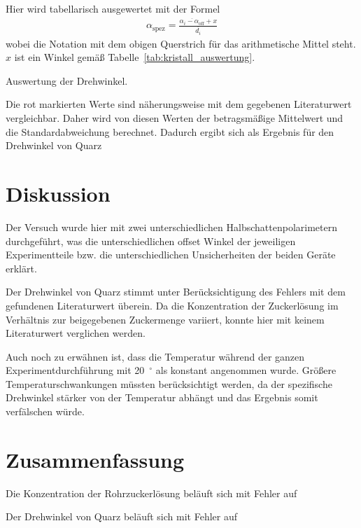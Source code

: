 \documentclass{article}
\newcommand{\as}{\alpha_\text{spez}}
\begin{document}
Hier wird tabellarisch ausgewertet mit der Formel
\begin{align*}
\as = \frac{\overline{\alpha_i-\alpha_{\text{off}}} + x}{\overline{d_i}}
\end{align*}
wobei die Notation mit dem obigen Querstrich für das arithmetische Mittel steht. $x$ ist ein Winkel gemäß Tabelle~\ref{tab:kristall_auswertung}.


\begin{table}[H]
\caption{Auswertung der Drehwinkel.}
\label{tab:kristall_auswertung}
\centering

\end{table}


Die rot markierten Werte sind näherungsweise mit dem gegebenen Literaturwert vergleichbar. Daher wird von diesen Werten der betragsmäßige Mittelwert und die Standardabweichung berechnet. Dadurch ergibt sich als Ergebnis für den Drehwinkel von Quarz 




\section{Diskussion}
Der Versuch wurde hier mit zwei unterschiedlichen Halbschattenpolarimetern durchgeführt, was die unterschiedlichen offset Winkel der jeweiligen Experimentteile bzw. die unterschiedlichen Unsicherheiten der beiden Geräte erklärt.

Der Drehwinkel von Quarz stimmt unter Berücksichtigung des Fehlers mit dem gefundenen Literaturwert \cite{spektrum} überein. Da die Konzentration der Zuckerlösung im Verhältnis zur beigegebenen Zuckermenge variiert, konnte hier mit keinem Literaturwert verglichen werden.

Auch noch zu erwähnen ist, dass die Temperatur während der ganzen Experimentdurchführung mit 20~$^\circ$ als konstant angenommen wurde. Größere Temperaturschwankungen müssten berücksichtigt werden, da der spezifische Drehwinkel stärker von der Temperatur abhängt und das Ergebnis somit verfälschen würde.




\section{Zusammenfassung}
Die Konzentration der Rohrzuckerlösung beläuft sich mit Fehler auf


Der Drehwinkel von Quarz beläuft sich mit Fehler auf

\end{document}
